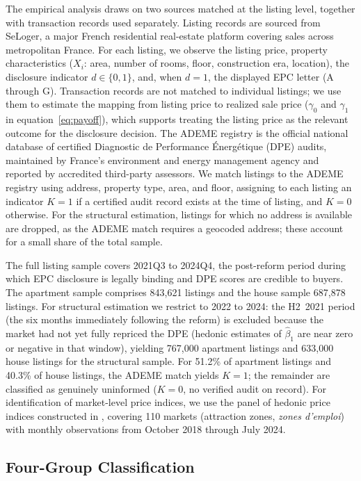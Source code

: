 \documentclass[10pt,letterpaper]{bp-template-concise}
\begin{document}
The empirical analysis draws on two sources matched at the listing level, together with transaction records used separately. Listing records are sourced from SeLoger, a major French residential real-estate platform covering sales across metropolitan France. For each listing, we observe the listing price, property characteristics ($X_i$: area, number of rooms, floor, construction era, location), the disclosure indicator $d\in\{0,1\}$, and, when $d=1$, the displayed EPC letter (A through G). Transaction records are not matched to individual listings; we use them to estimate the mapping from listing price to realized sale price ($\gamma_0$ and $\gamma_1$ in equation~\eqref{eq:payoff}), which supports treating the listing price as the relevant outcome for the disclosure decision. The ADEME registry is the official national database of certified Diagnostic de Performance Énergétique (DPE) audits, maintained by France's environment and energy management agency and reported by accredited third-party assessors. We match listings to the ADEME registry using address, property type, area, and floor, assigning to each listing an indicator $K=1$ if a certified audit record exists at the time of listing, and $K=0$ otherwise. For the structural estimation, listings for which no address is available are dropped, as the ADEME match requires a geocoded address; these account for a small share of the total sample.

The full listing sample covers 2021Q3 to 2024Q4, the post-reform period during which EPC disclosure is legally binding and DPE scores are credible to buyers. The apartment sample comprises 843,621 listings and the house sample 687,878 listings. For structural estimation we restrict to 2022 to 2024: the H2~2021 period (the six months immediately following the reform) is excluded because the market had not yet fully repriced the DPE (hedonic estimates of $\hat\beta_1$ are near zero or negative in that window), yielding 767,000 apartment listings and 633,000 house listings for the structural sample. For 51.2\% of apartment listings and 40.3\% of house listings, the ADEME match yields $K=1$; the remainder are classified as genuinely uninformed ($K=0$, no verified audit on record). For identification of market-level price indices, we use the panel of hedonic price indices constructed in \citet{patras_mandatory_2024}, covering 110 markets (attraction zones, \textit{zones d'emploi}) with monthly observations from October 2018 through July 2024.

\subsection{Four-Group Classification}
\end{document}
